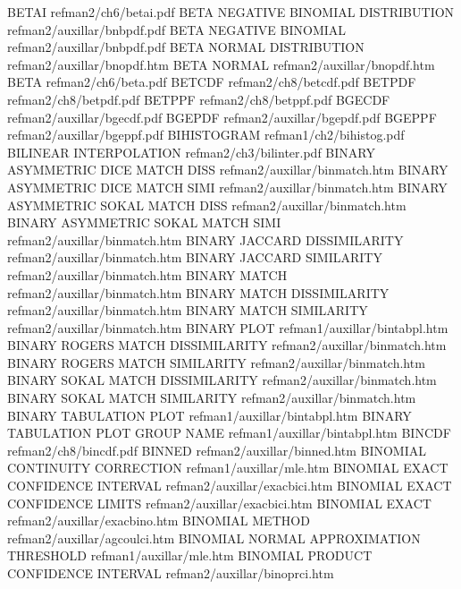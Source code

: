 BETAI                                   refman2/ch6/betai.pdf
BETA NEGATIVE BINOMIAL DISTRIBUTION     refman2/auxillar/bnbpdf.pdf
BETA NEGATIVE BINOMIAL                  refman2/auxillar/bnbpdf.pdf
BETA NORMAL DISTRIBUTION                refman2/auxillar/bnopdf.htm
BETA NORMAL                             refman2/auxillar/bnopdf.htm
BETA                                    refman2/ch6/beta.pdf
BETCDF                                  refman2/ch8/betcdf.pdf
BETPDF                                  refman2/ch8/betpdf.pdf
BETPPF                                  refman2/ch8/betppf.pdf
BGECDF                                  refman2/auxillar/bgecdf.pdf
BGEPDF                                  refman2/auxillar/bgepdf.pdf
BGEPPF                                  refman2/auxillar/bgeppf.pdf
BIHISTOGRAM                             refman1/ch2/bihistog.pdf
BILINEAR INTERPOLATION                  refman2/ch3/bilinter.pdf
BINARY ASYMMETRIC DICE MATCH DISS       refman2/auxillar/binmatch.htm
BINARY ASYMMETRIC DICE MATCH SIMI       refman2/auxillar/binmatch.htm
BINARY ASYMMETRIC SOKAL MATCH DISS      refman2/auxillar/binmatch.htm
BINARY ASYMMETRIC SOKAL MATCH SIMI      refman2/auxillar/binmatch.htm
BINARY JACCARD DISSIMILARITY            refman2/auxillar/binmatch.htm
BINARY JACCARD SIMILARITY               refman2/auxillar/binmatch.htm
BINARY MATCH                            refman2/auxillar/binmatch.htm
BINARY MATCH DISSIMILARITY              refman2/auxillar/binmatch.htm
BINARY MATCH SIMILARITY                 refman2/auxillar/binmatch.htm
BINARY PLOT                             refman1/auxillar/bintabpl.htm
BINARY ROGERS MATCH DISSIMILARITY       refman2/auxillar/binmatch.htm
BINARY ROGERS MATCH SIMILARITY          refman2/auxillar/binmatch.htm
BINARY SOKAL MATCH DISSIMILARITY        refman2/auxillar/binmatch.htm
BINARY SOKAL MATCH SIMILARITY           refman2/auxillar/binmatch.htm
BINARY TABULATION PLOT                  refman1/auxillar/bintabpl.htm
BINARY TABULATION PLOT GROUP NAME       refman1/auxillar/bintabpl.htm
BINCDF                                  refman2/ch8/bincdf.pdf
BINNED                                  refman2/auxillar/binned.htm
BINOMIAL CONTINUITY CORRECTION          refman1/auxillar/mle.htm
BINOMIAL EXACT CONFIDENCE INTERVAL      refman2/auxillar/exacbici.htm
BINOMIAL EXACT CONFIDENCE LIMITS        refman2/auxillar/exacbici.htm
BINOMIAL EXACT                          refman2/auxillar/exacbino.htm
BINOMIAL METHOD                         refman2/auxillar/agcoulci.htm
BINOMIAL NORMAL APPROXIMATION THRESHOLD refman1/auxillar/mle.htm
BINOMIAL PRODUCT CONFIDENCE INTERVAL    refman2/auxillar/binoprci.htm
